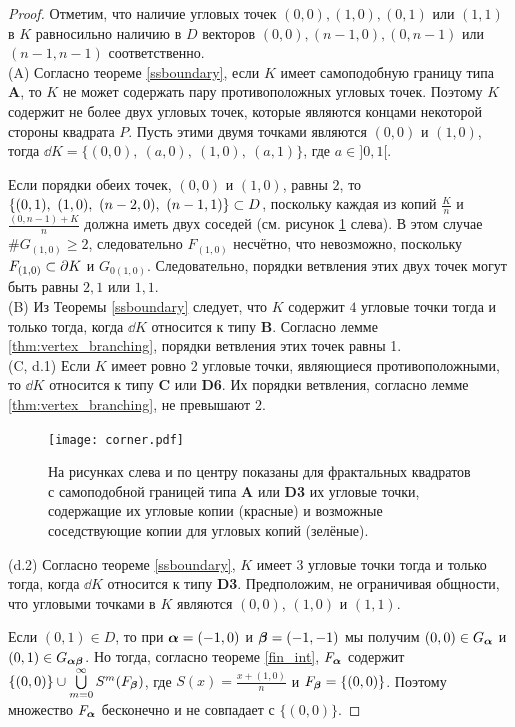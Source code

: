 \begin{proof}

Отметим, что наличие угловых точек $(0,0), (1,0), (0,1)$ или $(1,1)$ в $K$ равносильно наличию в $D$  векторов $(0,0), (n-1,0), (0,n-1)$ или $(n-1,n-1)$ соответственно.
\\

(A) Согласно теореме \ref{ssboundary}, если $K$ имеет самоподобную границу типа {\bf A}, то $K$ не может содержать пару противоположных угловых точек. 
Поэтому $K$ содержит не более двух угловых точек, которые являются концами некоторой стороны квадрата $P$. 
Пусть этими двумя точками являются $(0,0)$ и $(1,0)$, тогда $\dd K=\{(0,0),\ (a,0),\ (1,0),\ (a,1)\}$, где $a\in]0,1[$. 

Если порядки обеих точек, $(0,0)$ и $(1,0)$,  равны $2$, то $\{(0,1),\ (1,0),\ (n-2,0),\ (n-1,1)\}\subset D$, поскольку каждая из копий $\frac{K}{n}$ и $\frac{(0,n-1)+K}{n}$ должна иметь двух соседей (см. рисунок \ref{fig:corner} слева). 
В этом случае $\#G_{(1,0)}\geq2$, следовательно $F_{(1,0)}$ несчётно, что невозможно, поскольку $F_{(1,0)}\subset\partial K$ и $G_{0(1,0)}$.
Следовательно, порядки ветвления этих двух точек могут быть равны $2,1$ или $1,1$.\\

(B) Из Теоремы \ref{ssboundary} следует, что $K$ содержит $4$ угловые точки тогда и только тогда, когда $\dd K$ относится к типу {\bf B}.
Согласно лемме \ref{thm:vertex_branching}, порядки ветвления этих точек равны 1.\\

(C, d.1) Если $K$ имеет ровно $2$ угловые точки, являющиеся противоположными, то $\dd K$ относится к типу {\bf C} или {\bf D6}.
Их порядки ветвления, согласно лемме \ref{thm:vertex_branching}, не превышают $2$.
\begin{figure}[H]
\centering
\texttt{[image: corner.pdf]}
\caption{На рисунках слева и по центру показаны для фрактальных квадратов с самоподобной границей типа {\bf A} или {\bf D3} их угловые точки, содержащие их угловые копии (красные) и возможные соседствующие копии для угловых копий (зелёные).
}
\label{fig:corner}
\end{figure}

(d.2) Согласно теореме \ref{ssboundary}, $K$ имеет $3$ угловые точки тогда и только тогда, когда $\dd K$ относится к типу {\bf D3}.
Предположим, не ограничивая общности, что угловыми точками в $K$ являются $(0,0)$, $(1,0)$ и $(1,1)$.

Если $(0,1)\in D$, то при ${\bm{\alpha}}=(-1,0)$ и ${\bm{\beta}}=(-1,-1)$ мы получим $(0,0)\in G_{\bm{\alpha}}$ и $(0,1)\in G_{{\bm{\alpha}}{\bm{\beta}}}$.
Но тогда, согласно теореме \ref{fin_int}, $F_{\bm{\alpha}}$ содержит $\{(0,0)\}\cup\bigcup\limits_{m=0}^\infty S^m(F_{\bm{\beta}})$, где $S(x)=\frac{x+(1,0)}{n}$ и $F_{\bm{\beta}}=\{(0,0)\}$.
Поэтому множество $F_{\bm{\alpha}}$ бесконечно и не совпадает с $\{(0,0)\}$.


\end{proof}
